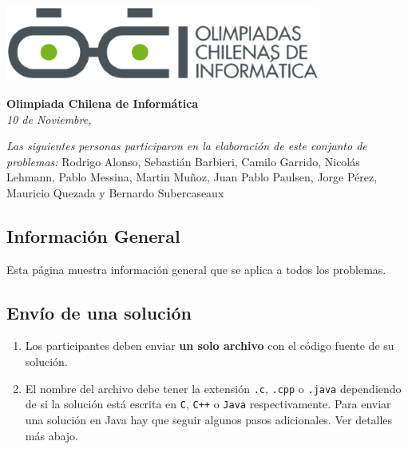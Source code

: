 \documentclass[12pt]{oci}
\begin{document}
  \begin{center}
  \includegraphics[height=70pt]{logo.eps}

  \vskip 70pt
  \Large{\bf Olimpiada Chilena de Inform\'atica\\ \the\year}
  \vskip 10pt
  \large{\phase}
  \vskip 10pt
  \normalsize{\it 10 de Noviembre, \the\year}

  \vskip 95pt

  \emph{Las siguientes personas participaron en la elaboración de este conjunto
    de problemas:}
  \vskip 10pt
    Rodrigo Alonso,
    Sebastián Barbieri,
    Camilo Garrido,
    \vskip 0.5pt
  Nicolás Lehmann,
    Pablo Messina,
    Martin Muñoz,
  Juan Pablo Paulsen,
  \vskip 0.5pt
    Jorge Pérez,
  Mauricio Quezada
y Bernardo Subercaseaux
  \end{center}


\cleardoublepage


\subsection*{Información General}

Esta página muestra información general que se aplica a todos los problemas.

\subsection*{Envío de una solución}

\begin{enumerate}
\item Los participantes deben enviar {\bf un solo archivo} con el código fuente de su solución.
\item El nombre del archivo debe tener la extensión \verb+.c+, \verb+.cpp+ o
  \verb+.java+ dependiendo de si la solución está escrita en \verb|C|,
  \verb|C++| o \verb|Java| respectivamente.
Para enviar una solución en Java hay que seguir algunos pasos adicionales. Ver detalles más abajo.
\end{enumerate}
\end{document}
